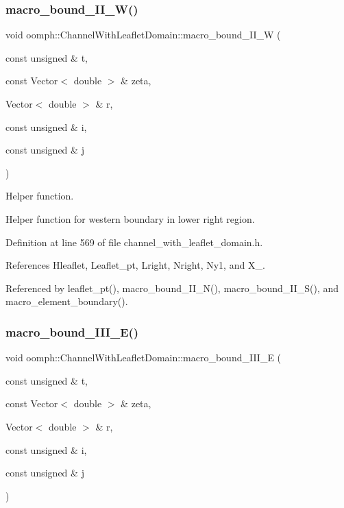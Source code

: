 \subsubsection{\texorpdfstring{macro\+\_\+bound\+\_\+\+I\+I\+\_\+\+W()}{macro\_bound\_II\_W()}}
{\footnotesize\ttfamily void oomph\+::\+Channel\+With\+Leaflet\+Domain\+::macro\+\_\+bound\+\_\+\+I\+I\+\_\+W (\begin{DoxyParamCaption}\item[{const unsigned \&}]{t,  }\item[{const Vector$<$ double $>$ \&}]{zeta,  }\item[{Vector$<$ double $>$ \&}]{r,  }\item[{const unsigned \&}]{i,  }\item[{const unsigned \&}]{j }\end{DoxyParamCaption})\hspace{0.3cm}{\ttfamily [protected]}}



Helper function. 

Helper function for western boundary in lower right region. 

Definition at line 569 of file channel\+\_\+with\+\_\+leaflet\+\_\+domain.\+h.



References Hleaflet, Leaflet\+\_\+pt, Lright, Nright, Ny1, and X\+\_.



Referenced by leaflet\+\_\+pt(), macro\+\_\+bound\+\_\+\+I\+I\+\_\+\+N(), macro\+\_\+bound\+\_\+\+I\+I\+\_\+\+S(), and macro\+\_\+element\+\_\+boundary().

\mbox{\label{classoomph_1_1ChannelWithLeafletDomain_af17451c66c723d841aa6f16505c51be3}} 
\subsubsection{\texorpdfstring{macro\+\_\+bound\+\_\+\+I\+I\+I\+\_\+\+E()}{macro\_bound\_III\_E()}}
{\footnotesize\ttfamily void oomph\+::\+Channel\+With\+Leaflet\+Domain\+::macro\+\_\+bound\+\_\+\+I\+I\+I\+\_\+E (\begin{DoxyParamCaption}\item[{const unsigned \&}]{t,  }\item[{const Vector$<$ double $>$ \&}]{zeta,  }\item[{Vector$<$ double $>$ \&}]{r,  }\item[{const unsigned \&}]{i,  }\item[{const unsigned \&}]{j }\end{DoxyParamCaption})\hspace{0.3cm}{\ttfamily [protected]}}



